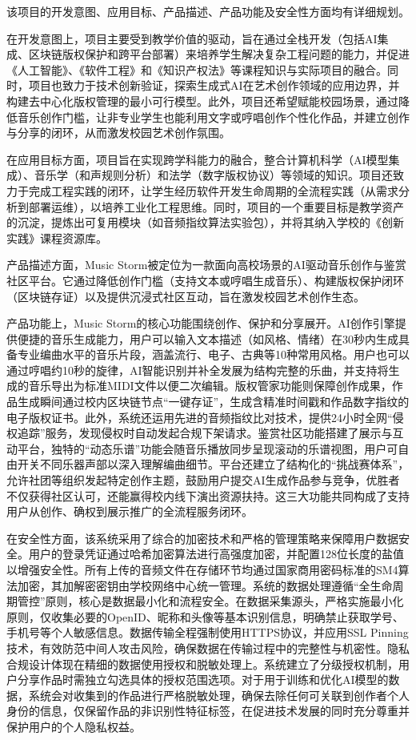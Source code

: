 \documentclass{base}
\begin{document}
该项目的开发意图、应用目标、产品描述、产品功能及安全性方面均有详细规划。

在开发意图上，项目主要受到教学价值的驱动，旨在通过全栈开发（包括AI集成、区块链版权保护和跨平台部署）来培养学生解决复杂工程问题的能力，并促进《人工智能》、《软件工程》和《知识产权法》等课程知识与实际项目的融合。同时，项目也致力于技术创新验证，探索生成式AI在艺术创作领域的应用边界，并构建去中心化版权管理的最小可行模型。此外，项目还希望赋能校园场景，通过降低音乐创作门槛，让非专业学生也能利用文字或哼唱创作个性化作品，并建立创作与分享的闭环，从而激发校园艺术创作氛围。

在应用目标方面，项目旨在实现跨学科能力的融合，整合计算机科学（AI模型集成）、音乐学（和声规则分析）和法学（数字版权协议）等领域的知识。项目还致力于完成工程实践的闭环，让学生经历软件开发生命周期的全流程实践（从需求分析到部署运维），以培养工业化工程思维。同时，项目的一个重要目标是教学资产的沉淀，提炼出可复用模块（如音频指纹算法实验包），并将其纳入学校的《创新实践》课程资源库。

产品描述方面，Music Storm被定位为一款面向高校场景的AI驱动音乐创作与鉴赏社区平台。它通过降低创作门槛（支持文本或哼唱生成音乐）、构建版权保护闭环（区块链存证）以及提供沉浸式社区互动，旨在激发校园艺术创作生态。

产品功能上，Music Storm的核心功能围绕创作、保护和分享展开。AI创作引擎提供便捷的音乐生成能力，用户可以输入文本描述（如风格、情绪）在30秒内生成具备专业编曲水平的音乐片段，涵盖流行、电子、古典等10种常用风格。用户也可以通过哼唱约10秒的旋律，AI智能识别并补全发展为结构完整的乐曲，并支持将生成的音乐导出为标准MIDI文件以便二次编辑。版权管家功能则保障创作成果，作品生成瞬间通过校内区块链节点“一键存证”，生成含精准时间戳和作品数字指纹的电子版权证书。此外，系统还运用先进的音频指纹比对技术，提供24小时全网“侵权追踪”服务，发现侵权时自动发起合规下架请求。鉴赏社区功能搭建了展示与互动平台，独特的“动态乐谱”功能会随音乐播放同步呈现滚动的乐谱视图，用户可自由开关不同乐器声部以深入理解编曲细节。平台还建立了结构化的“挑战赛体系”，允许社团等组织发起特定创作主题，鼓励用户提交AI生成作品参与竞争，优胜者不仅获得社区认可，还能赢得校内线下演出资源扶持。这三大功能共同构成了支持用户从创作、确权到展示推广的全流程服务闭环。

在安全性方面，该系统采用了综合的加密技术和严格的管理策略来保障用户数据安全。用户的登录凭证通过哈希加密算法进行高强度加密，并配置128位长度的盐值以增强安全性。所有上传的音频文件在存储环节均通过国家商用密码标准的SM4算法加密，其加解密密钥由学校网络中心统一管理。系统的数据处理遵循“全生命周期管控”原则，核心是数据最小化和流程安全。在数据采集源头，严格实施最小化原则，仅收集必要的OpenID、昵称和头像等基本识别信息，明确禁止获取学号、手机号等个人敏感信息。数据传输全程强制使用HTTPS协议，并应用SSL Pinning技术，有效防范中间人攻击风险，确保数据在传输过程中的完整性与机密性。隐私合规设计体现在精细的数据使用授权和脱敏处理上。系统建立了分级授权机制，用户分享作品时需独立勾选具体的授权范围选项。对于用于训练和优化AI模型的数据，系统会对收集到的作品进行严格脱敏处理，确保去除任何可关联到创作者个人身份的信息，仅保留作品的非识别性特征标签，在促进技术发展的同时充分尊重并保护用户的个人隐私权益。
\end{document}

